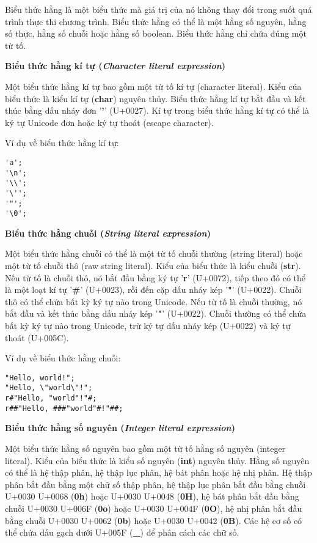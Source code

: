     Biểu thức hằng là một biểu thức mà giá trị của nó không thay đổi trong suốt quá trình thực thi chương trình. Biểu thức hằng có thể là một hằng số nguyên, hằng số thực, hằng số chuỗi hoặc hằng số boolean. Biểu thức hằng chỉ chứa đúng một từ tố.

\regexlitexpr

\noindent\textbf{Biểu thức hằng kí tự (\textit{Character literal expression})}

    Một biểu thức hằng kí tự bao gồm một từ tố kí tự (character literal). Kiểu của biểu thức là kiểu kí tự (\textbf{char}) nguyên thủy. Biểu thức hằng kí tự bắt đầu và kết thúc bằng dấu nháy đơn '\textbf{\textbf{'}}' (U+0027). Kí tự trong biểu thức hằng kí tự có thể là ký tự Unicode đơn hoặc ký tự thoát (escape character). 

\noindent Ví dụ về biểu thức hằng kí tự:
\begin{lstlisting}[]
'a';
'\n';
'\\';
'\'';
'"';
'\0';
\end{lstlisting}

\noindent\textbf{Biểu thức hằng chuỗi (\textit{String literal expression})}

    Một biểu thức hằng chuỗi có thể là một từ tố chuỗi thường (string literal) hoặc một từ tố chuỗi thô (raw string literal). Kiểu của biểu thức là kiểu chuỗi (\textbf{str}). Nếu từ tố là chuỗi thô, nó bắt đầu bằng ký tự '\textbf{r}' (U+0072), tiếp theo đó có thể là một loạt kí tự '\textbf{\#}' (U+0023), rồi đến cặp dấu nháy kép '\textbf{"}' (U+0022). Chuỗi thô có thể chứa bất kỳ ký tự nào trong Unicode. Nếu từ tố là chuỗi thường, nó bắt đầu và kết thúc bằng dấu nháy kép '\textbf{"}' (U+0022). Chuỗi thường có thể chứa bất kỳ ký tự nào trong Unicode, trừ ký tự dấu nháy kép (U+0022) và ký tự thoát (U+005C).

\noindent Ví dụ về biểu thức hằng chuỗi:
\begin{lstlisting}[]
"Hello, world!";
"Hello, \"world\"!";
r#"Hello, "world"!"#;
r##"Hello, ###"world"#!"##;
\end{lstlisting}

\noindent\textbf{Biểu thức hằng số nguyên (\textit{Integer literal expression})}

    Một biểu thức hằng số nguyên bao gồm một từ tố hằng số nguyên (integer literal). Kiểu của biểu thức là kiểu số nguyên (\textbf{int}) nguyên thủy. Hằng số nguyên có thể là hệ thập phân, hệ thập lục phân, hệ bát phân hoặc hệ nhị phân. Hệ thập phân bắt đầu bằng một chữ số thập phân, hệ thập lục phân bắt đầu bằng chuỗi U+0030 U+0068 (\textbf{0h}) hoặc U+0030 U+0048 (\textbf{0H}), hệ bát phân bắt đầu bằng chuỗi U+0030 U+006F (\textbf{0o}) hoặc U+0030 U+004F (\textbf{0O}), hệ nhị phân bắt đầu bằng chuỗi U+0030 U+0062 (\textbf{0b}) hoặc U+0030 U+0042 (\textbf{0B}). Các hệ cơ số có thể chứa dấu gạch dưới U+005F (\textbf{\_}) để phân cách các chữ số.

